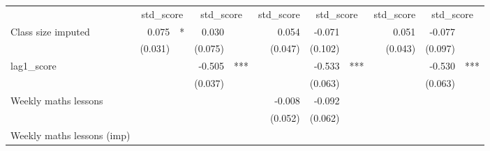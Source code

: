 \documentclass{article}
\begin{document}
\begin{table}[!h]
\centering
\begin{tabular}{lllllllllll}
\cline{1-11}
\multicolumn{1}{r}{} &
  \multicolumn{2}{c}{std\_score} &
  \multicolumn{2}{c}{std\_score} &
  \multicolumn{1}{c}{std\_score} &
  \multicolumn{2}{c}{std\_score} &
  \multicolumn{1}{c}{std\_score} &
  \multicolumn{2}{c}{std\_score} \\
\cline{1-11}
\multicolumn{1}{l}{Class size imputed} &
  \multicolumn{1}{r}{0.075} &
  \multicolumn{1}{l}{*} &
  \multicolumn{1}{r}{0.030} &
  \multicolumn{1}{l}{} &
  \multicolumn{1}{r}{0.054} &
  \multicolumn{1}{r}{-0.071} &
  \multicolumn{1}{l}{} &
  \multicolumn{1}{r}{0.051} &
  \multicolumn{1}{r}{-0.077} &
  \multicolumn{1}{l}{} \\
\multicolumn{1}{l}{} &
  \multicolumn{1}{r}{(0.031)} &
  \multicolumn{1}{l}{} &
  \multicolumn{1}{r}{(0.075)} &
  \multicolumn{1}{l}{} &
  \multicolumn{1}{r}{(0.047)} &
  \multicolumn{1}{r}{(0.102)} &
  \multicolumn{1}{l}{} &
  \multicolumn{1}{r}{(0.043)} &
  \multicolumn{1}{r}{(0.097)} &
  \multicolumn{1}{l}{} \\
\multicolumn{1}{l}{lag1\_score} &
  \multicolumn{1}{r}{} &
  \multicolumn{1}{l}{} &
  \multicolumn{1}{r}{-0.505} &
  \multicolumn{1}{l}{***} &
  \multicolumn{1}{r}{} &
  \multicolumn{1}{r}{-0.533} &
  \multicolumn{1}{l}{***} &
  \multicolumn{1}{r}{} &
  \multicolumn{1}{r}{-0.530} &
  \multicolumn{1}{l}{***} \\
\multicolumn{1}{l}{} &
  \multicolumn{1}{r}{} &
  \multicolumn{1}{l}{} &
  \multicolumn{1}{r}{(0.037)} &
  \multicolumn{1}{l}{} &
  \multicolumn{1}{r}{} &
  \multicolumn{1}{r}{(0.063)} &
  \multicolumn{1}{l}{} &
  \multicolumn{1}{r}{} &
  \multicolumn{1}{r}{(0.063)} &
  \multicolumn{1}{l}{} \\
\multicolumn{1}{l}{Weekly maths lessons} &
  \multicolumn{1}{r}{} &
  \multicolumn{1}{l}{} &
  \multicolumn{1}{r}{} &
  \multicolumn{1}{l}{} &
  \multicolumn{1}{r}{-0.008} &
  \multicolumn{1}{r}{-0.092} &
  \multicolumn{1}{l}{} &
  \multicolumn{1}{r}{} &
  \multicolumn{1}{r}{} &
  \multicolumn{1}{l}{} \\
\multicolumn{1}{l}{} &
  \multicolumn{1}{r}{} &
  \multicolumn{1}{l}{} &
  \multicolumn{1}{r}{} &
  \multicolumn{1}{l}{} &
  \multicolumn{1}{r}{(0.052)} &
  \multicolumn{1}{r}{(0.062)} &
  \multicolumn{1}{l}{} &
  \multicolumn{1}{r}{} &
  \multicolumn{1}{r}{} &
  \multicolumn{1}{l}{} \\
\multicolumn{1}{l}{Weekly maths lessons (imp)} &
  \multicolumn{1}{r}{} &
  \multicolumn{1}{l}{} &

\end{tabular}
\end{table}
\end{document}
